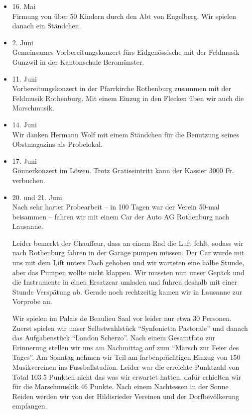\begin{history}
\begin{itemize}
        \item[]16. Mai\\
        Firmung von über 50 Kindern durch den Abt von Engelberg. Wir spielen
        danach ein Ständchen.

        \item[]2. Juni\\
        Gemeinsames Vorbereitungskonzert fürs Eidgenössische mit der Feldmusik
        Gunzwil in der Kantonschule Beromünster.

        \item[]11. Juni\\
        Vorbereitungskonzert in der Pfarrkirche Rothenburg zusammen mit der
        Feldmusik Rothenburg. Mit einem Einzug in den Flecken üben wir auch die
        Marschmusik.

        \item[]14. Juni\\
        Wir danken Hermann Wolf mit einem Ständchen für die Benutzung seines
        Obstmagazins als Probelokal.

        \item[]17. Juni\\
        Gönnerkonzert im Löwen. Trotz Gratiseintritt kann der Kassier 3000 Fr.
        verbuchen.

        \item[]20. und 21. Juni\\
        Nach sehr harter Probearbeit -- in 100 Tagen war der Verein 50-mal
        beisammen -- fahren wir mit einem Car der Auto AG Rothenburg nach
        Lausanne.

        Leider bemerkt der Chauffeur, dass an einem Rad die Luft fehlt, sodass
        wir nach Rothenburg fahren in der Garage pumpen müssen. Der Car wurde
        mit uns mit dem Lift unters Dach gehoben und wir warteten eine halbe
        Stunde, aber das Pumpen wollte nicht klappen. Wir mussten nun unser
        Gepäck und die Instrumente in einen Ersatzcar umladen und fuhren deshalb
        mit einer Stunde Verspätung ab. Gerade noch rechtzeitig kamen wir in
        Lausanne zur Vorprobe an.

        Wir spielen im Palais de Beaulieu Saal vor leider nur etwa 30 Personen.
        Zuerst spielen wir unser Selbstwahlstück \enquote{Synfonietta Pastorale} und
        danach das Aufgabenstück \enquote{London Scherzo}. Nach einem Gesamtfoto zur
        Erinnerung stellen wir uns am Nachmittag auf zum \enquote{Marsch zur Feier des
            Tages}. Am Sonntag nehmen wir Teil am farbenprächtigen Einzug von 150
        Musikvereinen ins Fussballstadion. Leider war die erreichte Punktzahl
        von Total 103.5 Punkten nicht das was wir erwartet hatten, dafür
        erhielten wir für die Marschmuskik 46 Punkte. Nach einem Nachtessen in
        der Sonne Reiden werden wir von der Hildisrieder Vereinen und der
        Dorfbevölkerung empfangen.


\end{itemize}
\end{history}
